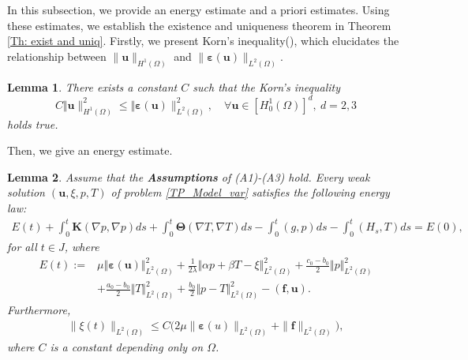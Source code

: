 \documentclass{article}
\newtheorem{lemma}{Lemma}[section]
\numberwithin{equation}{section}
\begin{document}

In this subsection, we provide an energy estimate and a priori estimates. Using these estimates, we establish the existence and uniqueness theorem in Theorem \ref{Th: exist and uniq}. Firstly, we present Korn's inequality(\cite{brenner2004korn}), which elucidates the relationship between \(\|\bm u\|_{H^1(\Omega)}\) and \(\|\bm\varepsilon(\bm u)\|_{L^2(\Omega)}\). %
\begin{lemma}\label{Korn's inequa}
There exists a constant $C$ such that the Korn’s inequality 
\begin{equation*}
               C \Vert  \bm  u\|_{H^1(\Omega)}^2   \le  \Vert\bm\varepsilon(\bm u)\|_{L^2(\Omega)}^2,
               \quad\forall \bm u\in [H^1_0(\Omega)]^d,~d=2,3
\end{equation*}
holds true.
\end{lemma}
Then, we give an energy estimate.
 \begin{lemma}\label{le: energy law}
 Assume that the {\bf Assumptions} of (A1)-(A3) hold. 
 Every weak solution $(\bm u,\xi,p,T)$ of problem \eqref{TP_Model_var} satisfies the following energy law:
\begin{equation}\label{EtE0 energy law}
\begin{aligned}
E(t)+\int_0^t \bm K(\nabla p,\nabla p)ds+\int_0^t\bm\Theta(\nabla T,\nabla T)ds
-\int_0^t(g,p)ds-\int_0^t( H_{s},T)ds
=E(0),
\end{aligned}
\end{equation}  
for all $t\in J$, where 
 \begin{equation}\label{E(t)}
 \begin{aligned}
      E(t):=&\mu\Vert\bm\varepsilon(\bm u)\Vert_{L^2(\Omega)}^2+\frac1{2\lambda}\Vert\alpha p+\beta T-\xi\Vert_{L^2(\Omega)}^2
  +\frac{c_0-b_0}{2}\Vert p\Vert_{L^2(\Omega)}^2\\
  &+\frac{a_0-b_0}{2}\Vert T\Vert_{L^2(\Omega)}^2+\frac{b_0}{2}\Vert p-T\Vert_{L^2(\Omega)}^2-(\bm f,\bm u).
 \end{aligned}
\end{equation}
Furthermore, 
 \begin{equation}\label{eq: bound xi}
 \begin{aligned}
  \|\xi(t)\|_{L^2(\Omega)}\le C\big(  2\mu\|\bm \varepsilon(u)\|_{L^2(\Omega)}   +\|\bm f\|_{L^2(\Omega)}   \big),
 \end{aligned}
\end{equation} 
where $C$ is a constant depending only on $\Omega$.
\end{lemma}
\end{document}
